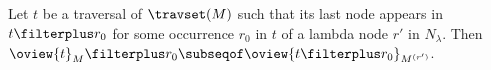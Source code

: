 \begin{proposition}
\label{prop:oview_trav_filtering}
   Let $t$ be a traversal of $\travset(M)$ such that its last node
   appears in $t \filterplus r_0$ for some occurrence $r_0$ in $t$ of a lambda node $r'$ in $N_\lambda$.
   Then $ \oview{t}_M\filterplus r_0 \subseqof \oview{t\filterplus r_0}_{M^{(r')}}$.
\end{proposition}
%
%
%
%
%
